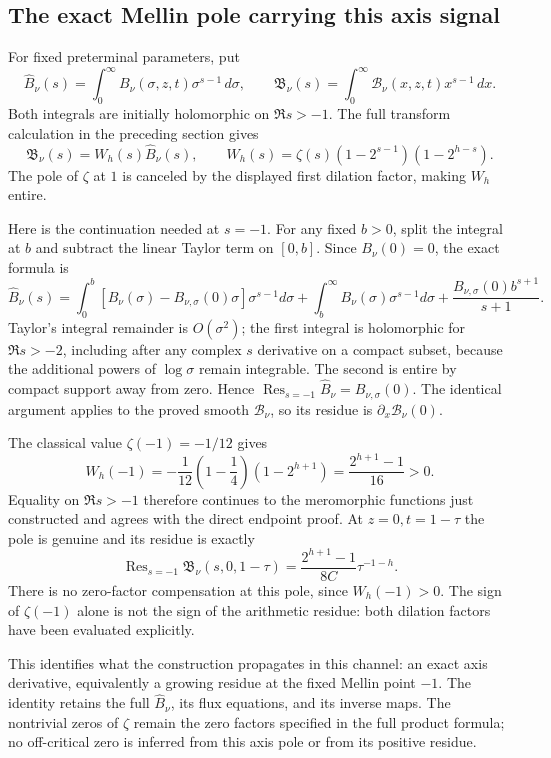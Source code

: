 \subsection{The exact Mellin pole carrying this axis signal}

For fixed preterminal parameters, put
\[
 \widehat B_\nu(s)=\int_0^\infty
                  B_\nu(\sigma,z,t)\sigma^{s-1}\,d\sigma,\qquad
 \mathfrak B_\nu(s)=\int_0^\infty
                  \mathcal B_\nu(x,z,t)x^{s-1}\,dx .
\]
Both integrals are initially holomorphic on \(\Re s>-1\).
The full transform calculation in the preceding section gives
\[
 \mathfrak B_\nu(s)=W_h(s)\widehat B_\nu(s),\qquad
 W_h(s)=\zeta(s)(1-2^{s-1})(1-2^{h-s}).
\]
The pole of \(\zeta\) at \(1\) is canceled by the displayed first
dilation factor, making \(W_h\) entire.

Here is the continuation needed at \(s=-1\). For any fixed \(b>0\),
split the integral at \(b\) and subtract the linear Taylor term on
\([0,b]\). Since \(B_\nu(0)=0\), the exact formula is
\[
 \widehat B_\nu(s)=
 \int_0^b [B_\nu(\sigma)-B_{\nu,\sigma}(0)\sigma]\sigma^{s-1}d\sigma
 +\int_b^\infty B_\nu(\sigma)\sigma^{s-1}d\sigma
 +\frac{B_{\nu,\sigma}(0)b^{s+1}}{s+1}.
\]
Taylor's integral remainder is \(O(\sigma^2)\); the first integral
is holomorphic for \(\Re s>-2\), including after any complex
\(s\) derivative on a compact subset, because the additional powers
of \(\log\sigma\) remain integrable. The second is entire by compact
support away from zero. Hence
\(\operatorname{Res}_{s=-1}\widehat B_\nu=B_{\nu,\sigma}(0)\).
The identical argument applies to the proved smooth
\(\mathcal B_\nu\), so its residue is \(\partial_x\mathcal B_\nu(0)\).

The classical value \(\zeta(-1)=-1/12\)
\cite[\S25.6(i)]{cqDLMFZeta} gives
\[
 W_h(-1)=-\frac1{12}\left(1-\frac14\right)(1-2^{h+1})
         =\frac{2^{h+1}-1}{16}>0.
\]
Equality on \(\Re s>-1\) therefore continues to the meromorphic
functions just constructed and agrees with the direct endpoint proof.
At \(z=0,t=1-\tau\) the pole is genuine and its residue is exactly
\begin{equation}\label{eq:cq-naj:residue}
 \operatorname{Res}_{s=-1}\mathfrak B_\nu(s,0,1-\tau)
     =\frac{2^{h+1}-1}{8C}\tau^{-1-h}.
\end{equation}
There is no zero-factor compensation at this pole, since \(W_h(-1)>0\).
The sign of \(\zeta(-1)\) alone is not the sign of the arithmetic
residue: both dilation factors have been evaluated explicitly.

This identifies what the construction propagates in this channel:
an exact axis derivative, equivalently a growing residue at the fixed
Mellin point \(-1\). The identity retains the full
\(\widehat B_\nu\), its flux equations, and its inverse maps.
The nontrivial zeros of \(\zeta\) remain the zero factors specified
in the full product formula; no off-critical zero is inferred from
this axis pole or from its positive residue.

